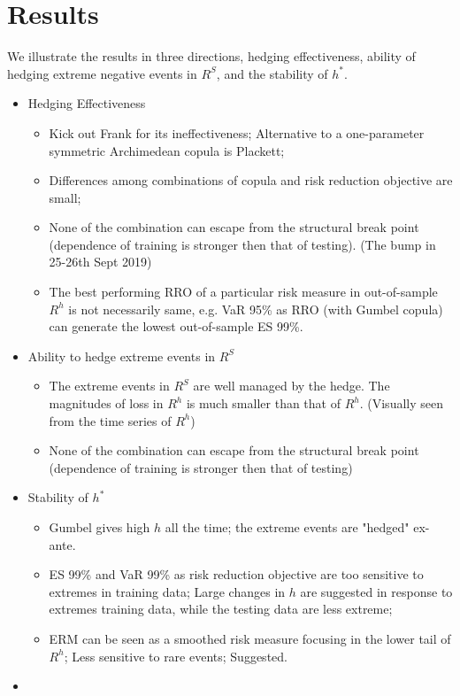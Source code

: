 \section{Results}
We illustrate the results in three directions, hedging effectiveness,
ability of hedging extreme negative events in $R^S$, and the stability of $h^*$.

\begin{itemize}
   \item  Hedging Effectiveness
   \begin{itemize}
     \item Kick out Frank for its ineffectiveness; Alternative to a one-parameter symmetric Archimedean copula is Plackett;
     \item Differences among combinations of copula and risk reduction objective are small;
     \item None of the combination can escape from the structural break point (dependence of training is stronger then that of testing). (The bump in 25-26th Sept 2019)
     \item The best performing RRO of a particular risk measure in out-of-sample $R^h$ is not necessarily same, e.g.
      VaR 95\% as RRO (with Gumbel copula) can generate the lowest out-of-sample ES 99\%.
   \end{itemize}
   \item Ability to hedge extreme events in $R^S$
   \begin{itemize}
     \item The extreme events in $R^S$ are well managed by the hedge.
     The magnitudes of loss in $R^h$ is much smaller than that of $R^h$. (Visually seen from the time series of $R^h$)
     \item None of the combination can escape from the structural break point (dependence of training is stronger then that of testing)
   \end{itemize}
   \item Stability of $h^\ast$
   \begin{itemize}
     \item Gumbel gives high $h$ all the time; the extreme events are "hedged" ex-ante.
     \item ES 99\% and VaR 99\% as risk reduction objective are too sensitive to extremes in training data;
     Large changes in $h$ are suggested in response to extremes training data, while the testing data are less extreme;
     \item ERM can be seen as a smoothed risk measure focusing in the lower tail of $R^h$; Less sensitive to rare events; Suggested.
   \end{itemize}
\item \end{itemize}


